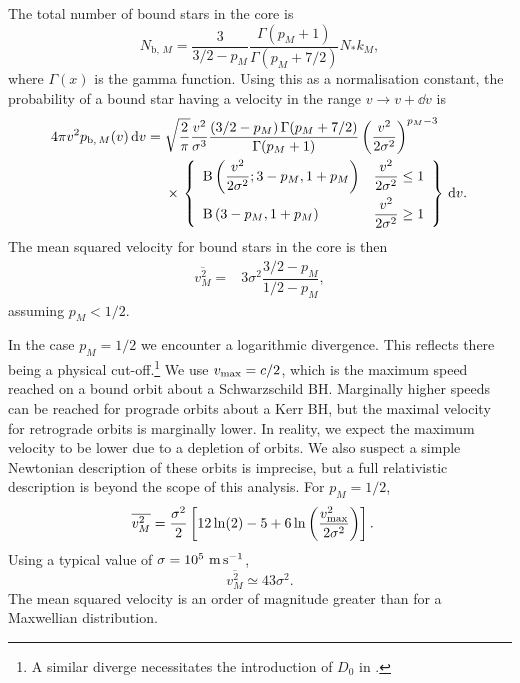 The total number of bound stars in the core is
\begin{equation}
N_{\mathrm{b},\,M} = \dfrac{3}{3/2 - p_M}\dfrac{\Gamma(p_M + 1)}{\Gamma(p_M + 7/2)}N_\ast k_M,
\end{equation}
where $\Gamma(x)$ is the gamma function. Using this as a normalisation constant, the probability of a bound star having a velocity in the range $v \rightarrow v + \dd v$ is
\begin{align}
4\pi v^2 p_{\mathrm{b},\,M}(v) \,\dd v = {} & \sqrt{\dfrac{2}{\pi}} \dfrac{v^2}{\sigma^3} \dfrac{\left(3/2 - p_M\right)\Gamma(p_M + 7/2)}{\Gamma(p_M + 1)} \left(\dfrac{v^2}{2\sigma^2}\right)^{p_M - 3} \nonumber \\* 
 {} & \times \left. \left\{\begin{array}{lr}
\Beta\left(\dfrac{v^2}{2\sigma^2}; 3 - p_M, 1 + p_M\right) \vspace{1mm} & \dfrac{v^2}{2\sigma^2} \leq 1 \\
\Beta\left(3 - p_M, 1 + p_M\right) & \dfrac{v^2}{2\sigma^2} \geq 1\end{array}\right\}\,\dd v. \right.
\end{align}
The mean squared velocity for bound stars in the core is then
\begin{align}
\overline{v^2_{M}} = {} & 3\sigma^2\dfrac{3/2 - p_M}{1/2 - p_M},
\end{align}
assuming $p_M < 1/2$.

In the case $p_M = 1/2$ we encounter a logarithmic divergence. This reflects there being a physical cut-off.\footnote{A similar diverge necessitates the introduction of $D_0$ in .} We use $v_\mathrm{max} = c/2$, which is the maximum speed reached on a bound orbit about a Schwarzschild BH. Marginally higher speeds can be reached for prograde orbits about a Kerr BH, but the maximal velocity for retrograde orbits is marginally lower. In reality, we expect the maximum velocity to be lower due to a depletion of orbits. We also suspect a simple Newtonian description of these orbits is imprecise, but a full relativistic description is beyond the scope of this analysis. For $p_M = 1/2$,
\begin{align}
\overline{v^2_{M}} = {} & \dfrac{\sigma^2}{2}\left[12\ln(2) - 5 + 6 \ln\left(\dfrac{v_\mathrm{max}^2}{2\sigma^2}\right)\right].
\end{align}
Using a typical value of $\sigma = 10^5~\mathrm{m\,s^{-1}}$,
\begin{equation}
\overline{v^2_{M}} \simeq 43\sigma^2.
\end{equation}
The mean squared velocity is an order of magnitude greater than for a Maxwellian distribution.

